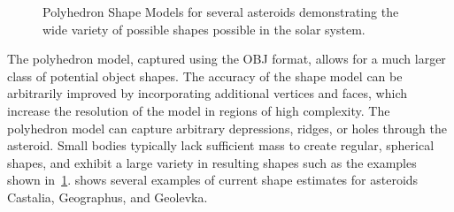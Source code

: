 \begin{figure}
    \centering

    \caption{Polyhedron Shape Models for several asteroids demonstrating the wide variety of possible shapes possible in the solar system.~\label{fig:asteroid_shape}}
\end{figure}
The polyhedron model, captured using the OBJ format, allows for a much larger class of potential object shapes. 
The accuracy of the shape model can be arbitrarily improved by incorporating additional vertices and faces, which increase the resolution of the model in regions of high complexity.
The polyhedron model can capture arbitrary depressions, ridges, or holes through the asteroid.
Small bodies typically lack sufficient mass to create regular, spherical shapes, and exhibit a large variety in resulting shapes such as the examples shown in~\cref{fig:asteroid_shape}.
 shows several examples of current shape estimates for asteroids Castalia, Geographus, and Geolevka.

